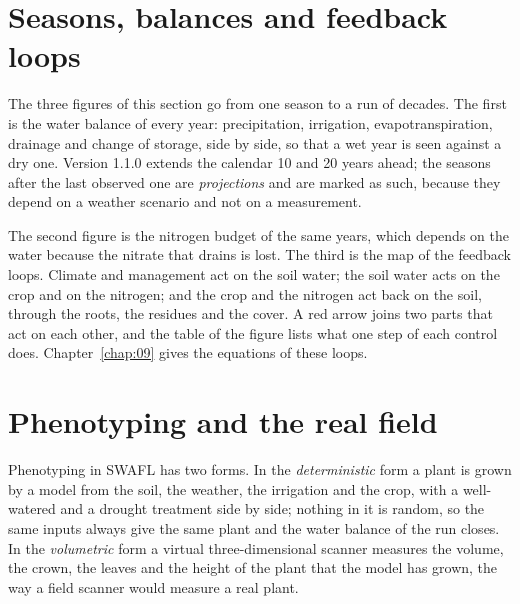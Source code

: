 
\section{Seasons, balances and feedback loops}
The three figures of this section go from one season to a run of decades. The first is the water balance of every year: precipitation, irrigation, evapotranspiration, drainage and change of storage, side by side, so that a wet year is seen against a dry one. Version 1.1.0 extends the calendar 10 and 20 years ahead; the seasons after the last observed one are \emph{projections} and are marked as such, because they depend on a weather scenario and not on a measurement.

The second figure is the nitrogen budget of the same years, which depends on the water because the nitrate that drains is lost. The third is the map of the feedback loops. Climate and management act on the soil water; the soil water acts on the crop and on the nitrogen; and the crop and the nitrogen act back on the soil, through the roots, the residues and the cover. A red arrow joins two parts that act on each other, and the table of the figure lists what one step of each control does. Chapter~\ref{chap:09} gives the equations of these loops.


\section{Phenotyping and the real field}
Phenotyping in SWAFL has two forms. In the \emph{deterministic} form a plant is grown by a model from the soil, the weather, the irrigation and the crop, with a well-watered and a drought treatment side by side; nothing in it is random, so the same inputs always give the same plant and the water balance of the run closes. In the \emph{volumetric} form a virtual three-dimensional scanner measures the volume, the crown, the leaves and the height of the plant that the model has grown, the way a field scanner would measure a real plant.

